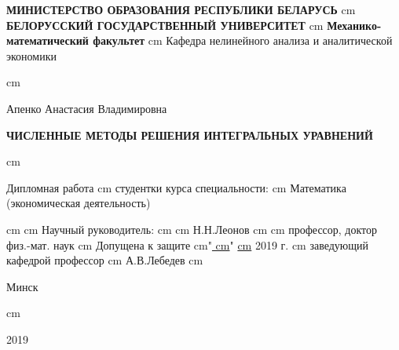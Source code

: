 \documentclass[12pt]{article}
\newcommand{\RomanNumeralCaps}[1]
{\MakeUppercase{\romannumeral #1}}
\begin{document}
	
\fontsize{14}{16pt}\selectfont 
\begin{titlepage}
	
	\thispagestyle{empty}
	\begin{center}
		{\bf МИНИСТЕРСТВО ОБРАЗОВАНИЯ РЕСПУБЛИКИ БЕЛАРУСЬ}  cm
		{\bf БЕЛОРУССКИЙ ГОСУДАРСТВЕННЫЙ УНИВЕРСИТЕТ}  cm 
		{\bf Механико-математический факультет} cm
		 {Кафедра нелинейного анализа и аналитической экономики}
	\end{center}
	 cm
	\begin{center}
		{Апенко Анастасия Владимировна}
	\end{center}
	
	\begin{center}
		\bf\Large ЧИСЛЕННЫЕ МЕТОДЫ РЕШЕНИЯ ИНТЕГРАЛЬНЫХ УРАВНЕНИЙ
	\end{center}
	 cm
	\begin{center}
		{Дипломная работа} cm		
		{студентки \RomanNumeralCaps{4} курса специальности:} cm 
		{ Математика}		
		{(экономическая деятельность)}
	\end{center}
	 cm  cm {Научный руководитель:  cm}  cm {Н.Н.Леонов}
	 cm  cm {профессор, доктор физ.-мат. наук}   cm
	Допущена к защите  cm"\underline{ cm}" \underline{ cm} 2019 г.  cm заведующий кафедрой профессор  cm А.В.Лебедев	
	 cm \centerline{Минск} cm \centerline{2019}
	

	\end{titlepage}
	
\end{document}
